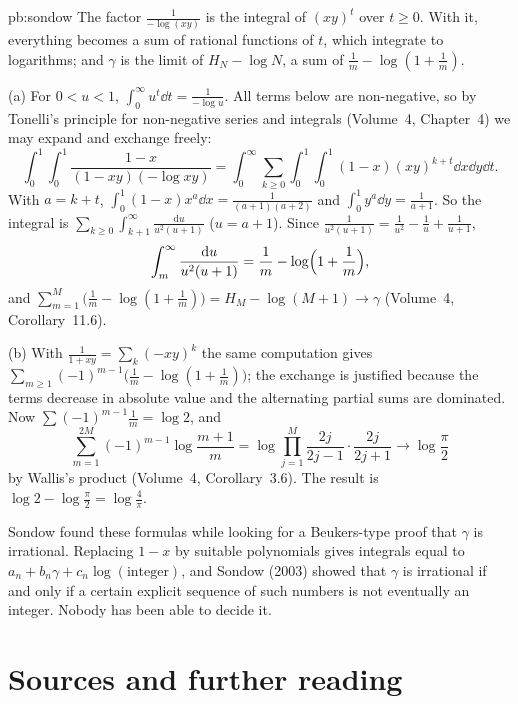 \begin{solution}{pb:sondow}
\idea The factor $\frac1{-\log(xy)}$ is the integral of $(xy)^t$ over $t\ge0$. With it, everything becomes a sum of rational
functions of $t$, which integrate to logarithms; and $\gamma$ is the limit of $H_N-\log N$, a sum of $\frac1m-\log(1+\frac1m)$.

\writeup (a) For $0<u<1$, $\int_0^\infty u^t\dd t=\frac1{-\log u}$. All terms below are non-negative, so by Tonelli's principle for
non-negative series and integrals (Volume~4, Chapter~4) we may expand and exchange freely:
\[
\int_0^1\!\!\int_0^1\frac{1-x}{(1-xy)(-\log xy)}=\int_0^\infty\sum_{k\ge0}\int_0^1\!\!\int_0^1(1-x)(xy)^{k+t}\dd x\dd y\dd t.
\]
With $a=k+t$, $\int_0^1(1-x)x^a\dd x=\frac1{(a+1)(a+2)}$ and $\int_0^1y^a\dd y=\frac1{a+1}$. So the integral is
$\sum_{k\ge0}\int_{k+1}^\infty\frac{\mathrm du}{u^2(u+1)}$ ($u=a+1$). Since $\frac1{u^2(u+1)}=\frac1{u^2}-\frac1u+\frac1{u+1}$,
\[
\int_m^\infty\frac{\mathrm du}{u^2(u+1)}=\frac1m-\log\Bigl(1+\frac1m\Bigr),
\]
and $\sum_{m=1}^M\bigl(\frac1m-\log(1+\frac1m)\bigr)=H_M-\log(M+1)\to\gamma$ (Volume~4, Corollary~11.6).

(b) With $\frac1{1+xy}=\sum_k(-xy)^k$ the same computation gives $\sum_{m\ge1}(-1)^{m-1}\bigl(\frac1m-\log(1+\frac1m)\bigr)$; the exchange is justified
because the terms decrease in absolute value and the alternating partial sums are dominated. Now $\sum(-1)^{m-1}\frac1m=\log2$, and
\[
\sum_{m=1}^{2M}(-1)^{m-1}\log\frac{m+1}m=\log\prod_{j=1}^M\frac{2j}{2j-1}\cdot\frac{2j}{2j+1}\longrightarrow\log\frac\pi2
\]
by Wallis's product (Volume~4, Corollary~3.6). The result is $\log2-\log\frac\pi2=\log\frac4\pi$.

\leads Sondow found these formulas while looking for a Beukers-type proof that $\gamma$ is irrational. Replacing $1-x$ by suitable
polynomials gives integrals equal to $a_n+b_n\gamma+c_n\log(\text{integer})$, and Sondow (2003) showed that $\gamma$ is irrational if and
only if a certain explicit sequence of such numbers is not eventually an integer. Nobody has been able to decide it.
\end{solution}

\section*{Sources and further reading}

